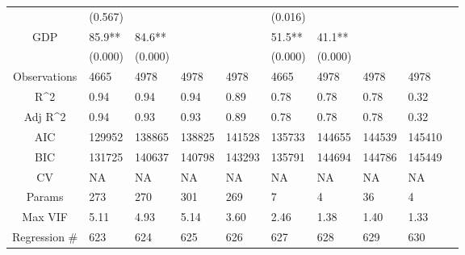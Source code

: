 \documentclass{article}
\begin{document}
\begin{table}[H]
\begin{tabular}{|clllllllll|}
   & (0.567) &  &  &  & (0.016) &  &  &  & \\ 
  GDP & 85.9** & 84.6** &  &  & 51.5** & 41.1** &  &  & \\ 
   & (0.000) & (0.000) &  &  & (0.000) & (0.000) &  &  & \\ 
  \hline 
 Observations & 4665 & 4978 & 4978 & 4978 & 4665 & 4978 & 4978 & 4978 & \\ 
  R^2 & 0.94 & 0.94 & 0.94 & 0.89 & 0.78 & 0.78 & 0.78 & 0.32 & \\ 
  Adj R^2 & 0.94 & 0.93 & 0.93 & 0.89 & 0.78 & 0.78 & 0.78 & 0.32 & \\ 
  AIC & 129952 & 138865 & 138825 & 141528 & 135733 & 144655 & 144539 & 145410 & \\ 
  BIC & 131725 & 140637 & 140798 & 143293 & 135791 & 144694 & 144786 & 145449 & \\ 
  CV & NA & NA & NA & NA & NA & NA & NA & NA & \\ 
  Params & 273 & 270 & 301 & 269 & 7 & 4 & 36 & 4 & \\ 
  Max VIF & 5.11 & 4.93 & 5.14 & 3.60 & 2.46 & 1.38 & 1.40 & 1.33 & \\ 
  Regression \# & 623 & 624 & 625 & 626 & 627 & 628 & 629 & 630 & \\ 
   \hline
\end{tabular}
 
\end{table}
\end{document}
